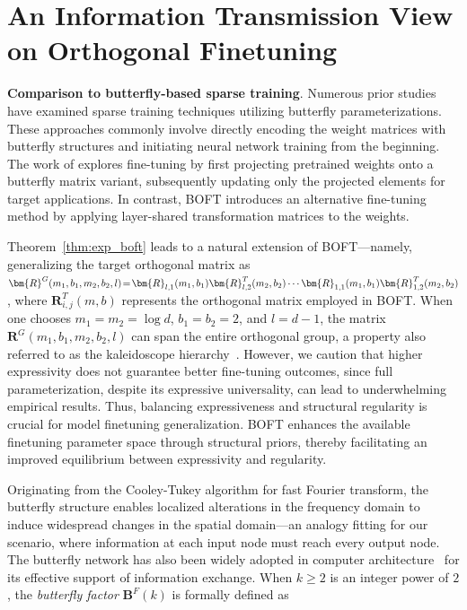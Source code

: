 \section{An Information Transmission View on Orthogonal Finetuning}

\textbf{Comparison to butterfly-based sparse training}. Numerous prior studies~\cite{dao2019learning,dao2019kaleidoscope,chen2022pixelated,dao2022monarch} have examined sparse training techniques utilizing butterfly parameterizations. These approaches commonly involve directly encoding the weight matrices with butterfly structures and initiating neural network training from the beginning. The work of \cite{dao2022monarch} explores fine-tuning by first projecting pretrained weights onto a butterfly matrix variant, subsequently updating only the projected elements for target applications. In contrast, BOFT introduces an alternative fine-tuning method by applying layer-shared transformation matrices to the weights.

Theorem~\ref{thm:exp_boft} leads to a natural extension of BOFT—namely, generalizing the target orthogonal matrix as $\thickmuskip=2mu \medmuskip=2mu \bm{R}^G(m_1,b_1,m_2,b_2,l)=\bm{R}_{l,1}(m_1,b_1)\bm{R}_{l,2}^T(m_2,b_2)\cdots\bm{R}_{1,1}(m_1,b_1)\bm{R}_{1,2}^T(m_2,b_2)$, where $\bm{R}_{i,j}^T(m,b)$ represents the orthogonal matrix employed in BOFT. When one chooses $m_1=m_2=\log d$, $b_1=b_2=2$, and $l=d-1$, the matrix $\bm{R}^G(m_1,b_1,m_2,b_2,l)$ can span the entire orthogonal group, a property also referred to as the kaleidoscope hierarchy~\cite{dao2019kaleidoscope}. However, we caution that higher expressivity does not guarantee better fine-tuning outcomes, since full parameterization, despite its expressive universality, can lead to underwhelming empirical results. Thus, balancing expressiveness and structural regularity is crucial for model finetuning generalization. BOFT enhances the available finetuning parameter space through structural priors, thereby facilitating an improved equilibrium between expressivity and regularity.

Originating from the Cooley-Tukey algorithm for fast Fourier transform, the butterfly structure enables localized alterations in the frequency domain to induce widespread changes in the spatial domain—an analogy fitting for our scenario, where information at each input node must reach every output node. The butterfly network has also been widely adopted in computer architecture~\cite{solihin2015fundamentals,li2011linear} for its effective support of information exchange. When $k\geq 2$ is an integer power of $2$, the \emph{butterfly factor} $\bm{B}^F(k)$ is formally defined as

